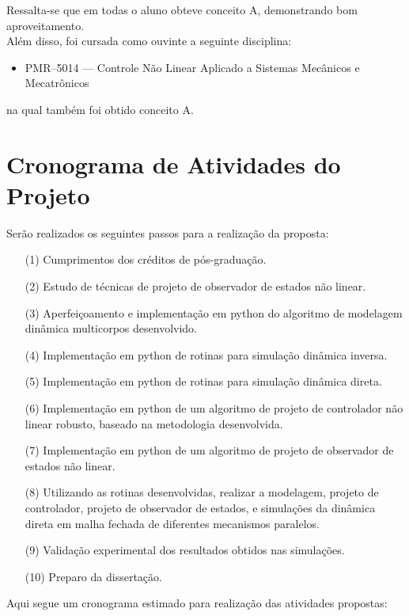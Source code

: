 \documentclass[a4paper,11pt,brazil,fleqn]{article}
\begin{document}
Ressalta-se que em todas o aluno obteve conceito A, demonstrando bom aproveitamento. \\

Al\'em disso, foi cursada como ouvinte a seguinte disciplina:
\begin{itemize}
\item PMR--5014 --- Controle N\~ao Linear Aplicado a Sistemas Mec\^anicos e Mecatr\^onicos	
\end{itemize}

na qual tamb\'em foi obtido conceito A.

\section{Cronograma de Atividades do Projeto}\label{S07}

Ser\~ao realizados os seguintes passos para a realiza\c{c}\~ao da proposta:

\begin{itemize}
\item[(1)] 	Cumprimentos dos cr\'editos de p\'os-gradua\c{c}\~ao.
\item[(2)]  Estudo de t\'ecnicas de projeto de observador de estados n\~ao linear.
\item[(3)]  Aperfei\c{c}oamento e implementa\c{c}\~ao em python do algoritmo de modelagem din\^amica multicorpos desenvolvido.
\item[(4)] 	Implementa\c{c}\~ao em python de rotinas para simula\c{c}\~ao din\^amica inversa.
\item[(5)]  Implementa\c{c}\~ao em python de rotinas para simula\c{c}\~ao din\^amica direta.
\item[(6)]  Implementa\c{c}\~ao em python de um algoritmo de projeto de controlador n\~ao linear robusto, baseado na metodologia desenvolvida.
\item[(7)]  Implementa\c{c}\~ao em python de um algoritmo de projeto de observador de estados n\~ao linear.
\item[(8)]  Utilizando as rotinas desenvolvidas, realizar a modelagem, projeto de controlador, projeto de observador de estados, e simula\c{c}\~oes da din\^amica direta em malha fechada de diferentes mecanismos paralelos.
\item[(9)] 	Valida\c{c}\~ao experimental dos resultados obtidos nas simula\c{c}\~oes.
\item[(10)] Preparo da disserta\c{c}\~ao.
\end{itemize}

Aqui segue um cronograma estimado para realiza\c{c}\~ao das atividades propostas:
\end{document}
